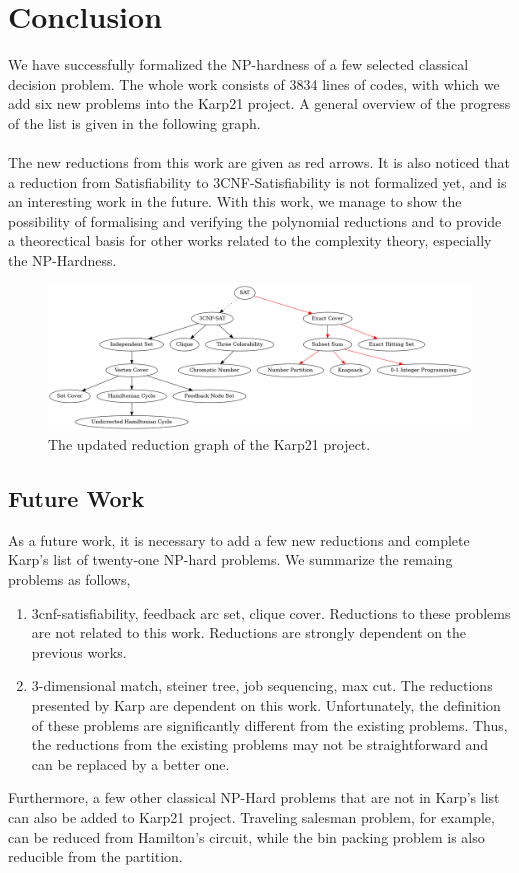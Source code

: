 \chapter{Conclusion}\label{chapter:conclusion}
We have successfully formalized the NP-hardness of 
a few selected classical decision problem.  
The whole work consists of 3834 lines of codes, with which we add 
six new problems into the Karp21 project. A general overview of the 
progress of the list is given in the following graph.\\\\
The new reductions from this work are given as red arrows. 
It is also noticed that a reduction from Satisfiability to 3CNF-Satisfiability is not 
formalized yet, and is an interesting work in the future. With this work,
we manage to show the possibility of formalising and verifying the polynomial 
reductions and to provide a theorectical basis for other works related 
to the complexity theory, especially the NP-Hardness. 
\begin{figure}[h!]
\centering 
\includegraphics[angle = 90, scale=0.39]{figures/reductions_new.png}
\caption{The updated reduction graph of the Karp21 project.}
\end{figure}

\section*{Future Work}
As a future work, it is necessary to add a few new reductions and complete Karp's 
list of twenty-one NP-hard problems. We summarize the remaing problems as follows,
\begin{enumerate}
    \item 3cnf-satisfiability, feedback arc set, clique cover. Reductions to these problems 
    are not related to this work. Reductions are strongly dependent on the previous works.
    \item 3-dimensional match, steiner tree, job sequencing, max cut. The reductions 
    presented by Karp are dependent on this work. Unfortunately, the definition of these problems 
    are significantly different from the existing problems. Thus, the reductions
    from the existing problems may not be straightforward and can be replaced by 
    a better one.
\end{enumerate}
Furthermore, a few other classical NP-Hard problems that are not in Karp's list 
can also be added to Karp21 project. Traveling salesman problem, for example, 
can be reduced from Hamilton's circuit, while the bin packing problem is also 
reducible from the partition. 
